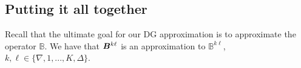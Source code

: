 \subsection{Putting it all together}
Recall that the ultimate goal for our DG approximation is to approximate the operator \(\mathbb B\). We have that \({  \boldsymbol B}^{k\ell}\) is an approximation to \(\mathbb B^{k\ell}\), \(k,\ell \in \{\nabla,1,...,K,\Delta\}\). 
%

